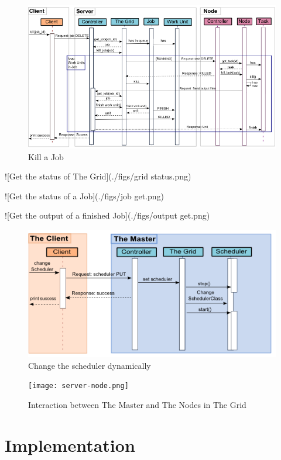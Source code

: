 \begin{figure}[htbp]
\centering
\includegraphics[keepaspectratio,width=\textwidth,height=0.75\textheight]{./figs/deletion.png}
\caption{Kill a Job}
\end{figure}


![Get the status of The Grid](.\slash figs\slash grid status.png)

![Get the status of a Job](.\slash figs\slash job get.png)

![Get the output of a finished Job](.\slash figs\slash output get.png)

\begin{figure}[htbp]
\centering
\includegraphics[keepaspectratio,width=\textwidth,height=0.75\textheight]{./figs/scheduler.png}
\caption{Change the scheduler dynamically}
\end{figure}


\begin{figure}[htbp]
\centering
\texttt{[image: server-node.png]}
\caption{Interaction between The Master and The Nodes in The Grid}
\end{figure}


\part{Implementation}
\label{implementation}

